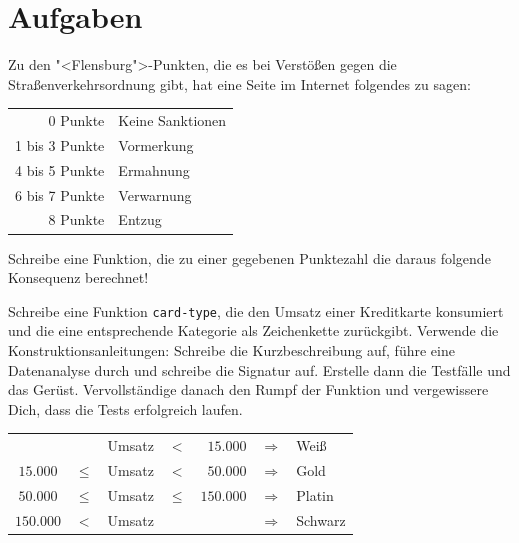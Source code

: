 \section*{Aufgaben}

\begin{aufgabe}
Zu den "<Flensburg">-Punkten, die es bei Verstößen gegen die
Straßenverkehrsordnung gibt, hat eine Seite im Internet folgendes zu
sagen:
%
\begin{center}
  \begin{tabular}{rl}
    0 Punkte & Keine Sanktionen\\
    1 bis 3 Punkte & Vormerkung\\
    4 bis 5 Punkte & Ermahnung\\
    6 bis 7 Punkte & Verwarnung\\
    8 Punkte & Entzug
  \end{tabular}
\end{center}
%
Schreibe eine Funktion, die zu einer gegebenen Punktezahl die daraus
folgende Konsequenz berechnet!
\end{aufgabe}

\begin{aufgabe}
  Schreibe eine Funktion \texttt{card-type}, die den Umsatz einer
  Kreditkarte konsumiert und die eine entsprechende Kategorie als
  Zeichenkette zurückgibt.  Verwende die Konstruktionsanleitungen:
  Schreibe die Kurzbeschreibung auf, führe eine
  Datenanalyse durch und schreibe die Signatur auf. Erstelle
  dann die Testfälle und das Gerüst.  Vervollständige danach den
  Rumpf der Funktion und vergewissere Dich, dass die Tests
  erfolgreich laufen. \\

  \begin{tabular}{crlcrll}
    &        & Umsatz & $<$ & $15.000$   & $\Longrightarrow$ & Weiß \\
    $15.000$  & $\leq$ & Umsatz & $<$ & $50.000 $  & $\Longrightarrow$ & Gold \\
    $50.000$  & $\leq$ & Umsatz & $\leq$ & $150.000 $ 
    & $\Longrightarrow$ & Platin \\
    $150.000$ & $<$ & Umsatz &     &            &  $\Longrightarrow$ & Schwarz \\
  \end{tabular} \\
\end{aufgabe}

